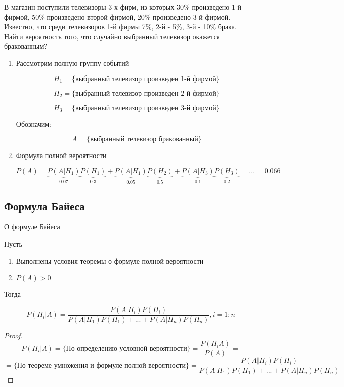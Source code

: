 \documentclass[a4paper, 14pt]{report}
\begin{document}
В магазин поступили телевизоры 3-х фирм, из которых 30\% произведено 1-й фирмой, 50\% произведено второй фирмой, 20\% произведено 3-й фирмой. Известно, что среди телевизоров 1-й фирмы 7\%, 2-й - 5\%, 3-й - 10\% брака. Найти вероятность того, что случайно выбранный телевизор окажется бракованным?

\begin{enumerate}
    \item Рассмотрим полную группу событий

        $$
        H_1 = \{ \text{выбранный телевизор произведен 1-й фирмой} \}
        $$


        $$
        H_2 = \{ \text{выбранный телевизор произведен 2-й фирмой} \}
        $$


        $$
        H_3 = \{ \text{выбранный телевизор произведен 3-й фирмой} \}
        $$

        Обозначим:

        $$
        A = \{ \text{выбранный телевизор бракованный} \}
        $$

    \item Формула полной вероятности

        $$
        P(A) = \underbrace{P(A|H_1)}_{0.07} \underbrace{P(H_1)}_{0.3} + \underbrace{P(A|H_1)}_{0.05} \underbrace{P(H_2)}_{0.5} + \underbrace{P(A|H_3)}_{0.1} \underbrace{P(H_3)}_{0.2} = ... = 0.066
        $$
\end{enumerate}

\subsection{Формула Байеса}

\begin{theorem}
    О формуле Байеса

    Пусть

    \begin{enumerate}
        \item Выполнены условия теоремы о формуле полной вероятности
        \item $P(A) > 0$
    \end{enumerate}

    Тогда

    $$
    P(H_i|A) = \frac{P(A|H_i) P(H_i)}{P(A|H_1) P(H_1) + ... + P(A|H_n) P(H_n) }, i = \overline{1;n}
    $$
\end{theorem}

\begin{proof}
    $$
    P(H_i|A) = \{\text{По определению условной вероятности}\}= \frac{P(H_i A)}{P(A)} = 
    $$
     $$
    = \{\text{По теореме умножения и формуле полной вероятности}\}= \frac{P(A|H_i) P(H_i)}{P(A|H_1) P(H_1) + ... + P(A|H_n) P(H_n) }
    $$
\end{proof}
\end{document}
